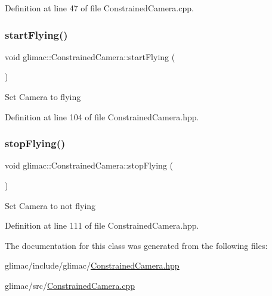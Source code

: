Definition at line 47 of file Constrained\+Camera.\+cpp.

\mbox{\label{classglimac_1_1_constrained_camera_aea3292bf2d944d9c99dd8c05e3898e54}} 
\subsubsection{\texorpdfstring{start\+Flying()}{startFlying()}}
{\footnotesize\ttfamily void glimac\+::\+Constrained\+Camera\+::start\+Flying (\begin{DoxyParamCaption}{ }\end{DoxyParamCaption})\hspace{0.3cm}{\ttfamily [inline]}}

Set Camera to flying 

Definition at line 104 of file Constrained\+Camera.\+hpp.

\mbox{\label{classglimac_1_1_constrained_camera_a532520a86171f57f721c37a9da6b7232}} 
\subsubsection{\texorpdfstring{stop\+Flying()}{stopFlying()}}
{\footnotesize\ttfamily void glimac\+::\+Constrained\+Camera\+::stop\+Flying (\begin{DoxyParamCaption}{ }\end{DoxyParamCaption})\hspace{0.3cm}{\ttfamily [inline]}}

Set Camera to not flying 

Definition at line 111 of file Constrained\+Camera.\+hpp.



The documentation for this class was generated from the following files\+:\begin{DoxyCompactItemize}
\item 
glimac/include/glimac/\hyperlink{_constrained_camera_8hpp}{Constrained\+Camera.\+hpp}\item 
glimac/src/\hyperlink{_constrained_camera_8cpp}{Constrained\+Camera.\+cpp}\end{DoxyCompactItemize}
